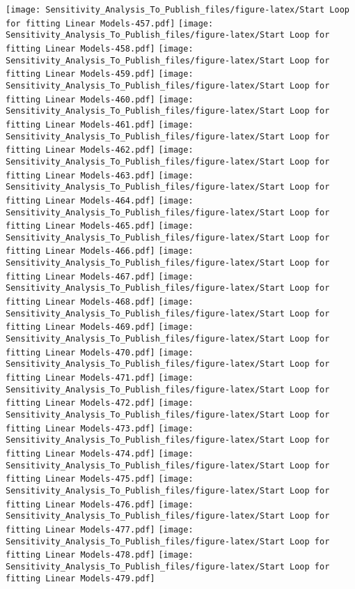 \documentclass[
]{article}
\begin{document}
\texttt{[image: Sensitivity\_Analysis\_To\_Publish\_files/figure-latex/Start Loop for fitting Linear Models-457.pdf]}
\texttt{[image: Sensitivity\_Analysis\_To\_Publish\_files/figure-latex/Start Loop for fitting Linear Models-458.pdf]}
\texttt{[image: Sensitivity\_Analysis\_To\_Publish\_files/figure-latex/Start Loop for fitting Linear Models-459.pdf]}
\texttt{[image: Sensitivity\_Analysis\_To\_Publish\_files/figure-latex/Start Loop for fitting Linear Models-460.pdf]}
\texttt{[image: Sensitivity\_Analysis\_To\_Publish\_files/figure-latex/Start Loop for fitting Linear Models-461.pdf]}
\texttt{[image: Sensitivity\_Analysis\_To\_Publish\_files/figure-latex/Start Loop for fitting Linear Models-462.pdf]}
\texttt{[image: Sensitivity\_Analysis\_To\_Publish\_files/figure-latex/Start Loop for fitting Linear Models-463.pdf]}
\texttt{[image: Sensitivity\_Analysis\_To\_Publish\_files/figure-latex/Start Loop for fitting Linear Models-464.pdf]}
\texttt{[image: Sensitivity\_Analysis\_To\_Publish\_files/figure-latex/Start Loop for fitting Linear Models-465.pdf]}
\texttt{[image: Sensitivity\_Analysis\_To\_Publish\_files/figure-latex/Start Loop for fitting Linear Models-466.pdf]}
\texttt{[image: Sensitivity\_Analysis\_To\_Publish\_files/figure-latex/Start Loop for fitting Linear Models-467.pdf]}
\texttt{[image: Sensitivity\_Analysis\_To\_Publish\_files/figure-latex/Start Loop for fitting Linear Models-468.pdf]}
\texttt{[image: Sensitivity\_Analysis\_To\_Publish\_files/figure-latex/Start Loop for fitting Linear Models-469.pdf]}
\texttt{[image: Sensitivity\_Analysis\_To\_Publish\_files/figure-latex/Start Loop for fitting Linear Models-470.pdf]}
\texttt{[image: Sensitivity\_Analysis\_To\_Publish\_files/figure-latex/Start Loop for fitting Linear Models-471.pdf]}
\texttt{[image: Sensitivity\_Analysis\_To\_Publish\_files/figure-latex/Start Loop for fitting Linear Models-472.pdf]}
\texttt{[image: Sensitivity\_Analysis\_To\_Publish\_files/figure-latex/Start Loop for fitting Linear Models-473.pdf]}
\texttt{[image: Sensitivity\_Analysis\_To\_Publish\_files/figure-latex/Start Loop for fitting Linear Models-474.pdf]}
\texttt{[image: Sensitivity\_Analysis\_To\_Publish\_files/figure-latex/Start Loop for fitting Linear Models-475.pdf]}
\texttt{[image: Sensitivity\_Analysis\_To\_Publish\_files/figure-latex/Start Loop for fitting Linear Models-476.pdf]}
\texttt{[image: Sensitivity\_Analysis\_To\_Publish\_files/figure-latex/Start Loop for fitting Linear Models-477.pdf]}
\texttt{[image: Sensitivity\_Analysis\_To\_Publish\_files/figure-latex/Start Loop for fitting Linear Models-478.pdf]}
\texttt{[image: Sensitivity\_Analysis\_To\_Publish\_files/figure-latex/Start Loop for fitting Linear Models-479.pdf]}
\end{document}
